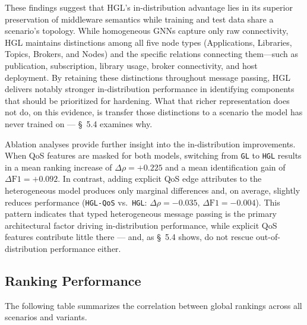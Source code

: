 \documentclass[review]{elsarticle}
\begin{document}
These findings suggest that HGL's in-distribution advantage lies in its superior preservation of
middleware semantics while training and test data share a scenario's topology. While homogeneous
GNNs capture only raw connectivity, HGL maintains distinctions among all five node types
(Applications, Libraries, Topics, Brokers, and Nodes) and the specific relations connecting
them---such as publication, subscription, library usage, broker connectivity, and host
deployment. By retaining these distinctions throughout message passing, HGL delivers notably
stronger in-distribution performance in identifying components that should be prioritized for
hardening. What that richer representation does not do, on this evidence, is transfer those
distinctions to a scenario the model has never trained on --- \S~5.4 examines why.

Ablation analyses provide further insight into the in-distribution improvements. When QoS features
are masked for both models, switching from \texttt{GL} to \texttt{HGL} results in a mean ranking
increase of $\Delta\rho=+0.225$ and a mean identification gain of $\Delta\text{F1}=+0.092$. In
contrast, adding explicit QoS edge attributes to the heterogeneous model produces only marginal
differences and, on average, slightly reduces performance (\texttt{HGL-QoS} vs.\ \texttt{HGL}:
$\Delta\rho=-0.035$, $\Delta\text{F1}=-0.004$). This pattern indicates that typed heterogeneous
message passing is the primary architectural factor driving in-distribution performance, while
explicit QoS features contribute little there --- and, as \S~5.4 shows, do not rescue
out-of-distribution performance either.

\subsection{Ranking Performance}

The following table summarizes the correlation between global rankings across all scenarios and
variants.
\end{document}
